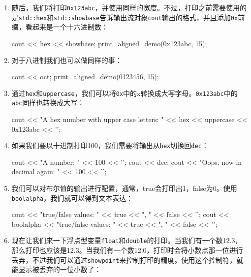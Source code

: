 \begin{enumerate}
\item 随后，我们将打印\texttt{0x123abc}，并使用同样的宽度。不过，打印之前需要使用的是\texttt{std::hex}和\texttt{std::showbase}告诉输出流对象\texttt{cout}输出的格式，并且添加\texttt{0x}前缀，看起来是一个十六进制数：

\begin{codebox}[cpp]
    cout << hex << showbase;
    print_aligned_demo(0x123abc, 15); 
\end{codebox}

\item 对于八进制我们也可以做同样的事：

\begin{codebox}[cpp]
    cout << oct;
    print_aligned_demo(0123456, 15);
\end{codebox}

\item 通过\texttt{hex}和\texttt{uppercase}，我们可以将\texttt{0x}中的x转换成大写字母。\texttt{0x123abc}中的\texttt{abc}同样也转换成大写：

\begin{codebox}[cpp]
    cout << "A hex number with upper case letters: "
        << hex << uppercase << 0x123abc << '\n';    
\end{codebox}

\item 如果我们要以十进制打印100，我们需要将输出从\texttt{hex}切换回\texttt{dec}：

\begin{codebox}[cpp]
    cout << "A number: " << 100 << '\n';
    cout << dec;
    cout << "Oops. now in decimal again: " << 100 << '\n';
\end{codebox}

\item 我们可以对布尔值的输出进行配置，通常，true会打印出1，false为0。使用\texttt{boolalpha}，我们就可以得到文本表达：

\begin{codebox}[cpp]
    cout << "true/false values: "
        << true << ", " << false << '\n';
    cout << boolalpha
        << "true/false values: "
        << true << ", " << false << '\n';
\end{codebox}

\item 现在让我们来一下浮点型变量\texttt{float}和\texttt{double}的打印。当我们有一个数12.3，那么打印也应该是12.3。当我们有一个数12.0，打印时会将小数点那一位进行丢弃，不过我们可以通过\texttt{showpoint}来控制打印的精度。使用这个控制符，就能显示被丢弃的一位小数了：


\end{enumerate}
